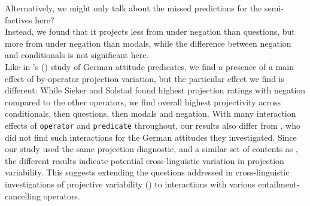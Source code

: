 \documentclass[12pt, a4paper]{article}
\newcommand{\posscite}[1]{\citeauthor{#1}'s (\citeyear{#1})}
\begin{document}
	 Alternatively, we might only talk about the missed predictions for the semi-factives here? \\

	\noindent Instead, we found that it projects less from under negation than questions, but more from under negation than modals, while the difference between negation and conditionals is not significant here.\\

	Like in \posscite{sieker_projective_2022} study of German attitude predicates, we find a presence of a main effect of by-operator projection variation, but the particular effect we find is different: While Sieker and Solstad found highest projection ratings with negation compared to the other operators, we find overall highest projectivity across conditionals, then questions, then modals and negation.
	With many interaction effects of \texttt{operator} and \texttt{predicate} throughout, our results also differ from , who did not find such interactions for the German attitudes they investigated.
	Since our study used the same projection diagnostic, and a similar set of contents as \cite{sieker_projective_2022}, the different results indicate potential cross-linguistic variation in projection variability. This suggests 
	extending the questions addressed in cross-linguistic investigations of projective variability (\citealt{tonhauser_projection_2020,xue_correlation_2011,tonhauser_how_2018}) to interactions with various entailment-cancelling operators.

	
\end{document}
